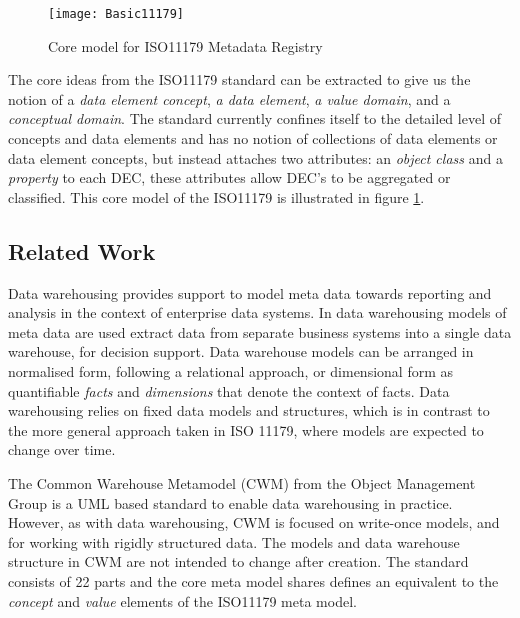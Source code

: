 \begin{figure}[here]
	\texttt{[image: Basic11179]}
	\caption{Core model for ISO11179 Metadata Registry} 
	\label{fig:basicMDR}
\end{figure}

The core ideas from the ISO11179 standard can be extracted to give us the notion of a \emph{data element concept}, \emph{a data element}, \emph{a value domain}, and a \emph{conceptual domain}. The standard currently confines itself to the detailed level of concepts and data elements and has no notion of collections of data elements or data element concepts, but instead attaches two attributes: an \emph{object class} and a \emph{property} to each DEC, these attributes allow DEC's to be aggregated or classified. This core model of the ISO11179 is illustrated in figure \ref{fig:basicMDR}.





\subsection{Related Work}

Data warehousing provides support to model meta data towards reporting and analysis in the context of enterprise data systems. In data warehousing models of meta data are used extract data from separate business systems into a single data warehouse, for decision support. Data warehouse models can be arranged in normalised form, following a relational approach, or dimensional form as quantifiable \emph{facts} and \emph{dimensions} that denote the context of facts. Data warehousing relies on fixed data models and structures, which is in contrast to the more general approach taken in ISO 11179, where models are expected to change over time. 

The Common Warehouse Metamodel (CWM) from the Object Management Group is a UML based standard to enable data warehousing in practice. However, as with data warehousing, CWM is focused on write-once models, and for working with rigidly structured data. The models and data warehouse structure in CWM are not intended to change after creation. The standard consists of 22 parts and the core meta model shares defines an equivalent to the \emph{concept} and \emph{value} elements of the ISO11179 meta model.

